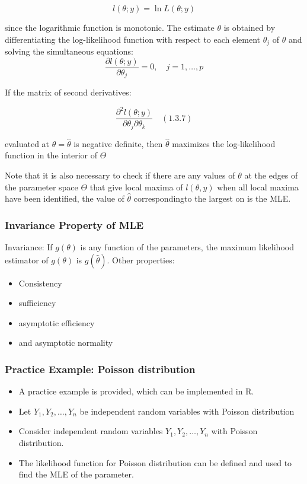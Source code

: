 \documentclass[11pt]{article}
\begin{document}
\begin{equation}
    l(\theta; y) = \ln L(\theta; y)
\end{equation}

since the logarithmic function is monotonic. The estimate $\theta$ is obtained by differentiating the log-likelihood function with respect to each element $\theta_j$ of $\theta$ and solving the simultaneous equations:
\begin{equation}
    \frac{\partial l(\theta; y)}{\partial \theta_j} = 0, \quad j = 1, \ldots, p
\end{equation}

If the matrix of second derivatives:

\begin{equation}
    \frac{\partial^2 l(\theta; y)}{\partial \theta_j \partial \theta_k} \quad (1.3.7)
\end{equation}

evaluated at $\theta = \hat{\theta}$ is negative definite, then $\hat{\theta}$ maximizes the log-likelihood function in the interior of $\Theta$

Note that it is also necessary to check if there are any values of $\theta$ at the edges of the parameter space $\Theta$ that give local maxima of $l(\theta,y)$ when all local maxima have been identified, the value of $\hat{\theta}$ correspondingto the largest on is the MLE.

\subsubsection{Invariance Property of MLE}
Invariance: If \( g(\theta) \) is any function of the parameters, the maximum likelihood estimator of \( g(\theta) \) is \( g(\hat{\theta}) \). Other properties:
\begin{itemize}
    \item Consistency
    \item sufficiency
    \item asymptotic efficiency
    \item and asymptotic normality
\end{itemize}

\subsubsection{Practice Example: Poisson distribution}

\begin{itemize}
    \item A practice example is provided, which can be implemented in R.
    \item Let $Y_1, Y_2,\dots, Y_n$ be independent random variables with Poisson distribution
    \item Consider independent random variables \( Y_1, Y_2, \ldots, Y_n \) with Poisson distribution.
    \item The likelihood function for Poisson distribution can be defined and used to find the MLE of the parameter.
\end{itemize}
\end{document}
